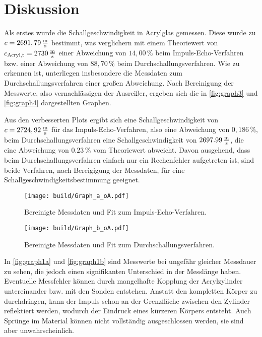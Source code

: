 \section{Diskussion}
\label{sec:Diskussion}
Als erstes wurde die Schallgeschwindigkeit in Acrylglas gemessen.%
Diese wurde zu $c = 2691,79 \,\unit{\frac{\meter}{\second}}$ bestimmt, was verglichern mit einem Theoriewert von
$c_{\text{Acryl},\text{t}} = 2730 \,\unit{\frac{\meter}{\second}} $ einer Abweichung von $14,00 \, \%$ beim Impuls-Echo-Verfahren 
bzw. einer Abweichung von $88,70 \, \%$ beim Durchschallungsverfahren. 
Wie zu erkennen ist, unterliegen insbesondere die Messdaten zum Durchschallungsverfahren einer großen Abweichung.
Nach Bereinigung der Messwerte, also vernachlässigen der Ausreißer, ergeben sich die in \autoref{fig:graph3} und \autoref{fig:graph4}%
dargestellten Graphen.

Aus den verbesserten Plots ergibt sich eine Schallgeschwindigkeit von $c = 2724,92 \,\unit{\frac{\meter}{\second}}$ für das
Impuls-Echo-Verfahren, also eine Abweichung von $0,186 \,\%$, beim Durchschallungsverfahren eine Schallgeschwindigkeit von
$2697.99 \,\unit{\frac{\meter}{\second}}$, die eine Abweichung von $0.23 \, \% $ vom Theoriewert abweicht. %
Davon ausgehend, dass beim Durchschallungsverfahren einfach nur ein Rechenfehler aufgetreten ist, sind beide Verfahren, nach
Bereigigung der Messdaten, für eine Schallgeschwindigkeitsbestimmung geeignet. \\

\begin{figure}[H]
    \centering
    \texttt{[image: build/Graph\_a\_oA.pdf]}
    \caption{Bereinigte Messdaten und Fit zum Impuls-Echo-Verfahren.}
    \label{fig:graph3}
\end{figure}

\begin{figure}[H]
    \centering
    \texttt{[image: build/Graph\_b\_oA.pdf]}
    \caption{Bereinigte Messdaten und Fit zum Durchschallungsverfahren.}
    \label{fig:graph4}
\end{figure}

In \autoref{fig:graph1a} und \autoref{fig:graph1b} sind Messwerte bei ungefähr gleicher Messdauer zu sehen, die jedoch einen signifikanten Unterschied in der Messlänge haben.
Eventuelle Messfehler können durch mangelhafte Kopplung der Acrylzylinder untereinander bzw. mit den Sonden entstehen.
Anstatt den kompletten Körper zu durchdringen, kann der Impuls schon an der Grenzfläche zwischen den Zylinder reflektiert werden,
wodurch der Eindruck eines kürzeren Körpers entsteht. 
Auch Sprünge im Material können nicht vollständig ausgeschlossen werden, sie sind aber unwahrscheinlich. \\

